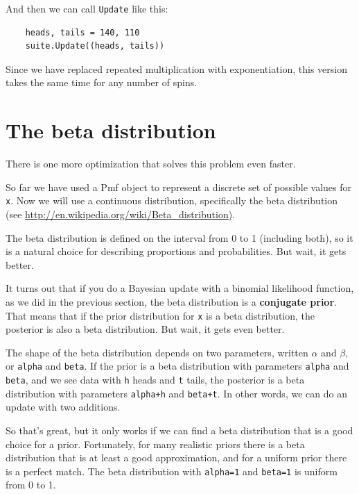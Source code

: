 \documentclass[12pt]{book}
\begin{document}
And then we can call \verb"Update" like this:

\begin{verbatim}
    heads, tails = 140, 110
    suite.Update((heads, tails))
\end{verbatim}

Since we have replaced repeated multiplication with exponentiation,
this version takes the same time for any number of spins.


\section{The beta distribution}
\label{beta}

There is one more optimization that solves this problem
even faster.

So far we have used a Pmf object to represent a discrete set of
possible values for {\tt x}.  Now we will use a continuous
distribution, specifically the beta distribution (see
\url{http://en.wikipedia.org/wiki/Beta_distribution}).

The beta distribution is defined on the interval from 0 to 1
(including both), so it is a natural choice for describing
proportions and probabilities.  But wait, it gets better.

It turns out that if you do a Bayesian update with a binomial
likelihood function, as we did in the previous section, the beta
distribution is a {\bf conjugate prior}.  That means that if the prior
distribution for {\tt x} is a beta distribution, the posterior is also
a beta distribution.  But wait, it gets even better.

The shape of the beta distribution depends on two parameters, written
$\alpha$ and $\beta$, or {\tt alpha} and {\tt beta}.  If the prior
is a beta distribution with parameters {\tt alpha} and {\tt beta}, and
we see data with {\tt h} heads and {\tt t} tails, the posterior is a
beta distribution with parameters {\tt alpha+h} and {\tt beta+t}.  In
other words, we can do an update with two additions.

So that's great, but it only works if we can find a beta distribution
that is a good choice for a prior.  Fortunately, for many realistic
priors there is a beta distribution that is at least a good
approximation, and for a uniform prior there is a perfect match.  The
beta distribution with {\tt alpha=1} and {\tt beta=1} is uniform from
0 to 1.
\end{document}
